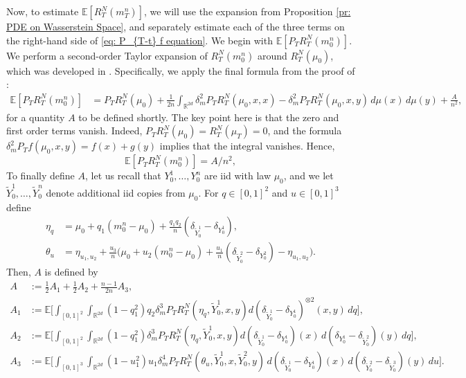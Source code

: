 \documentclass[11pt,reqno]{amsart}
\numberwithin{equation}{section}
\theoremstyle{definition}
\def\E{{\mathbb E}}
\def\R{{\mathbb R}}
\begin{document}
    Now, to estimate $\E[R^N_T(m^n_T)]$, we will use the expansion from Proposition \ref{pr: PDE on Wasserstein Space}, and separately estimate each of the three terms on the right-hand side of \eqref{eq: P_{T-t} f equation}. We begin with $\E[P_TR^N_T(m^n_0)]$. We perform a  second-order Taylor expansion of $R^N_T(m^n_0)$ around $R^N_T(\mu_0)$, which was developed in \cite{Chassagneux2022-jt}. Specifically, we apply the final formula from the proof of \cite[Theorem 2.14(ii)]{Chassagneux2022-jt}:
    \begin{align*}
        \E[P_T R^N_T(m_0^n)] &= P_T R^N_T(\mu_0) +  \frac{1}{2n}\int_{\R^{2d}} \delta^2_m P_T R^N_T(\mu_0,x,x)-\delta_m^2 P_T R^N_T(\mu_0,x,y) \,d\mu(x)\,d\mu(y)+ \frac{A}{n^2},
    \end{align*}
    for a quantity $A$ to be defined shortly. The key point here is that the  zero and first order terms vanish. Indeed, $P_T R^N_T(\mu_0)=R^N_T(\mu_T)=0$, and the formula $\delta_m^2 P_{T} f(\mu_0,x,y)=f(x)+g(y)$ implies that the integral vanishes. Hence,
    \begin{equation}
        \E[P_T R^N_T(m_0^n)] = A/n^2, \label{eq:PTRNT1}
    \end{equation}
    To finally define $A$, let us recall that $Y^1_0,\ldots,Y^n_0$ are iid with law $\mu_0$, and we let $\widetilde{Y}_0^1,\dots,\widetilde{Y}_0^n$ denote additional iid copies from $\mu_0$. For $q \in [0,1]^2$ and $u \in [0,1]^3$  define
    \begin{align*}
        \eta_{q}&= \mu_0+q_1(m_0^n-\mu_0)+\frac{q_1 q_2}{n}(\delta_{\widetilde{Y}_0^1}-\delta_{Y^1_0}), \\
        \theta_{u}&=\eta_{u_1,u_2}+\frac{u_3}{n}\Big(\mu_0+u_2(m_0^n-\mu_0)+\frac{u_1}{n}(\delta_{\widetilde{Y}_0^2}-\delta_{Y_0^2})-\eta_{u_1,u_2}\Big).
    \end{align*}
Then, $A$ is defined by 
\begin{align*}
        A &:= \frac12 A_1 + \frac12 A_2 + \frac{n-1}{2n}A_3, \\
        A_1 &:= \E\Big[\int_{[0,1]^2}\int_{\R^{2d}} (1-q_1^2)q_2 \delta^3_m P_T R^N_T(\eta_{q},\widetilde{Y}_0^1,x,y)d(\delta_{\widetilde{Y}_0^1}-\delta_{Y_0^1})^{\otimes 2}(x,y)\,dq\Big],  \\
        A_2 &:= \E\Big[\int_{[0,1]^2}\int_{\R^{2d}} (1-q_1^2) \delta^3_m P_T R^N_T(\eta_{q},\widetilde{Y}_0^1,x,y)d(\delta_{\widetilde{Y}_0^1}-\delta_{Y_0^1})(x)\,d(\delta_{Y_0^1}-\delta_{\widetilde{Y}_0^2})(y)\,dq\Big], \\
        A_3 &:=  \E\Big[\int_{[0,1]^3}\int_{\R^{2d}} (1-u_1^2)u_1 \delta^4_m P_T R^N_T(\theta_{u},\widetilde{Y}_0^1,x,\widetilde{Y}_0^2,y) \, d(\delta_{\widetilde{Y}_0^1}-\delta_{Y_0^1})(x)\,d(\delta_{\widetilde{Y}_0^2}-\delta_{\widetilde{Y}_0^3})(y)\,du\Big]. 
    \end{align*}
\end{document}

